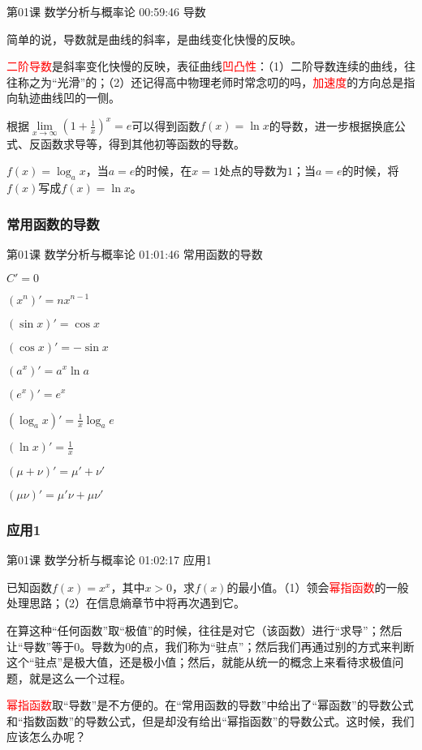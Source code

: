 \documentclass[UTF8]{ctexart}
\begin{document}
第01课 数学分析与概率论 00:59:46 导数

简单的说，导数就是曲线的斜率，是曲线变化快慢的反映。

\textcolor{red}{二阶导数}是斜率变化快慢的反映，表征曲线\textcolor{red}{凹凸性}：（1）二阶导数连续的曲线，往往称之为“光滑”的；（2）还记得高中物理老师时常念叨的吗，\textcolor{red}{加速度}的方向总是指向轨迹曲线凹的一侧。

根据$\underset{x \rightarrow \infty}{\lim} \left (  1+\frac{1}{x} \right )^{x}=e$可以得到函数$f(x)=\ln x$的导数，进一步根据换底公式、反函数求导等，得到其他初等函数的导数。

$f(x)=\log _{a}x$，当$a=e$的时候，在$x=1$处点的导数为$1$；当$a=e$的时候，将$f(x)$写成$f(x)=\ln x$。

\subsubsection{常用函数的导数}

第01课 数学分析与概率论 01:01:46 常用函数的导数

$C'=0$       

$(x^{n})'=nx^{n-1}$

$(\sin x)'=\cos x$

$(\cos x)'=-\sin x$

$(a^{x})'=a^{x}\ln a$

$(e^{x})'=e^{x}$

$(\log_{a}{x})'=\frac{1}{x}\log_{a}{e}$

$(\ln x)'=\frac{1}{x}$

$(\mu+\nu)'=\mu'+\nu'$

$(\mu\nu)'=\mu'\nu+\mu\nu'$

\subsubsection{应用1}

第01课 数学分析与概率论 01:02:17 应用1

已知函数$f(x)=x^{x}$，其中$x>0$，求$f(x)$的最小值。（1）领会\textcolor{red}{幂指函数}的一般处理思路；（2）在信息熵章节中将再次遇到它。



在算这种“任何函数”取“极值”的时候，往往是对它（该函数）进行“求导”；然后让“导数”等于0。导数为0的点，我们称为“驻点”；然后我们再通过别的方式来判断这个“驻点”是极大值，还是极小值；然后，就能从统一的概念上来看待求极值问题，就是这么一个过程。

\textcolor{red}{幂指函数}取“导数”是不方便的。在“常用函数的导数”中给出了“幂函数”的导数公式和“指数函数”的导数公式，但是却没有给出“幂指函数”的导数公式。这时候，我们应该怎么办呢？
\end{document}
